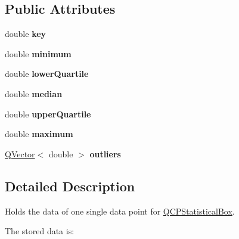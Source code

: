 \subsection*{Public Attributes}
\begin{DoxyCompactItemize}
\item 
\mbox{\label{class_q_c_p_statistical_box_data_a2d0b5ca5130e8a73294c46b8b2fd77b8}} 
double {\bfseries key}
\item 
\mbox{\label{class_q_c_p_statistical_box_data_adc2f4b8cbff9f2e4a676f32bad8a7e3a}} 
double {\bfseries minimum}
\item 
\mbox{\label{class_q_c_p_statistical_box_data_af9f478b4ea0789fa6cff7eebb654b5d4}} 
double {\bfseries lower\+Quartile}
\item 
\mbox{\label{class_q_c_p_statistical_box_data_a116cd53ae6685979ec3b051cfc7dbba5}} 
double {\bfseries median}
\item 
\mbox{\label{class_q_c_p_statistical_box_data_a5604dfe04b103e5ac73ce7895b46303b}} 
double {\bfseries upper\+Quartile}
\item 
\mbox{\label{class_q_c_p_statistical_box_data_aa2800abda337decfc4277cb8bf846d6f}} 
double {\bfseries maximum}
\item 
\mbox{\label{class_q_c_p_statistical_box_data_aaf0f7d4616b881a341fdcb8b1d122e65}} 
\hyperlink{class_q_vector}{Q\+Vector}$<$ double $>$ {\bfseries outliers}
\end{DoxyCompactItemize}


\subsection{Detailed Description}
Holds the data of one single data point for \hyperlink{class_q_c_p_statistical_box}{Q\+C\+P\+Statistical\+Box}. 

The stored data is\+:

